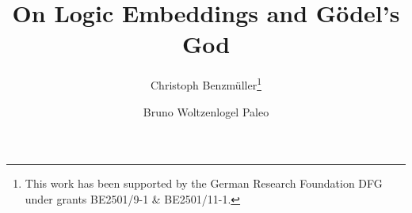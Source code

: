 \documentclass{llncs}
\begin{document}
\title{On Logic Embeddings and G\"odel's God}

\author{Christoph Benzm\"uller\thanks{This work has been supported by
    the German Research Foundation DFG under grants BE2501/9-1 \&
    BE2501/11-1.} \and Bruno Woltzenlogel Paleo
}


\maketitle            






%
%
\end{document}
